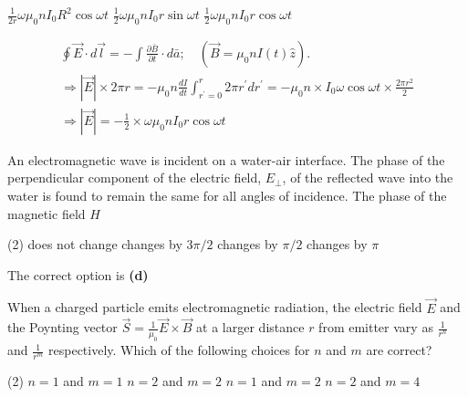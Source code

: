 \begin{enumerate}
\begin{tasks}
	\task[\textbf{B.}]$\frac{1}{2 r} \omega \mu_{0} n I_{0} R^{2} \cos \omega t$
	\task[\textbf{C.}]$\frac{1}{2} \omega \mu_{0} n I_{0} r \sin \omega t$
	\task[\textbf{D.}]$\frac{1}{2} \omega \mu_{0} n I_{0} r \cos \omega t$
\end{tasks}
\begin{answer}
	$$ \begin{aligned}
	\oint \vec{E} \cdot d \vec{l}=-\int \frac{\partial \bar{B}}{\partial t} \cdot d \bar{a} ; \quad\left(\vec{B}=\mu_{0} n I(t) \hat{z}\right) . \\
	\Rightarrow|\vec{E}| \times 2 \pi r=-\mu_{0} n \frac{d I}{d t} \int_{r^{\prime}=0}^{r} 2 \pi r^{\prime} d r^{\prime}=-\mu_{0} n \times I_{0} \omega \cos \omega t \times \frac{2 \pi r^{2}}{2} \\
	\Rightarrow|\vec{E}|=-\frac{1}{2} \times \omega \mu_{0} n I_{0} r \cos \omega t
	\end{aligned}$$	
\end{answer}
\begin{minipage}{\textwidth}
	\item An electromagnetic wave is incident on a water-air interface. The phase of the perpendicular component of the electric field, $E_{\perp}$, of the reflected wave into the water is found to remain the same for all angles of incidence. The phase of the magnetic field $H$
\end{minipage}
\begin{tasks}(2)
	\task[\textbf{A.}]does not change
	\task[\textbf{B.}]changes by $3 \pi / 2$
	\task[\textbf{C.}]changes by $\pi / 2$
	\task[\textbf{D.}]changes by $\pi$
\end{tasks}
\begin{answer}
	The correct option is \textbf{(d)}	
\end{answer}
\begin{minipage}{\textwidth}
	\item When a charged particle emits electromagnetic radiation, the electric field $\vec{E}$ and the Poynting vector $\vec{S}=\frac{1}{\mu_{0}} \vec{E} \times \vec{B}$ at a larger distance $r$ from emitter vary as $\frac{1}{r^{n}}$ and $\frac{1}{r^{m}}$ respectively. Which of the following choices for $n$ and $m$ are correct?
\end{minipage}
\begin{tasks}(2)
	\task[\textbf{A.}] $n=1$ and $m=1$
	\task[\textbf{B.}]$n=2$ and $m=2$
	\task[\textbf{C.}]$n=1$ and $m=2$
	\task[\textbf{D.}] $n=2$ and $m=4$

\end{tasks}
\end{enumerate}
